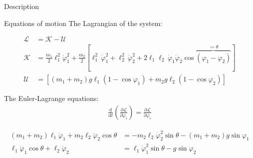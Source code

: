 \documentclass{beamer}
\begin{document}
\begin{frame}{Description}

\begin{figure}
    \centering
    
\end{figure}
\end{frame}

\begin{frame}{Equations of motion}
The Lagrangian of the system:
\begin{small}
\begin{align*}
    \mathcal{L}&=\mathcal{K}-\mathcal{U}\\
    \mathcal{K} &= \frac{m_1}{2} \ell_1^2 \dot \varphi_1^2 + \frac{m_2}{2} \left[ \ell_1^2\, \dot \varphi_1^2 + \ell_2^2\, \dot \varphi_2^2  + 2 \ell_1 \ell_2 \, \dot \varphi_1 \dot \varphi_2 \cos{\overbrace{\left(\varphi_1 - \varphi_2\right)}^{\coloneqq \theta}}\right] \\
    \mathcal{U} &= \left[\left(m_1+m_2\right)g \ell_1 \left(1 - \cos{\varphi_1}\right) + m_2 g \ell_2 \left(1 - \cos \varphi_2\right)\right]
\end{align*}
\end{small}
\pause

The Euler-Lagrange equations:
\begin{align*}
    \frac{\mathrm{d}}{\mathrm{d}t} \left(\frac{\partial \mathcal{L}}{\partial \dot \varphi_i}\right) = \frac{\partial \mathcal{L}}{\partial \varphi_i}
\end{align*}
\pause

\begin{small}
\begin{align*}
    (m_1+m_2) \ell_1 \ddot \varphi_1 + m_2 \ell_2 \ddot \varphi_2 \cos \theta &= -m_2 \ell_2 \dot \varphi_2^2 \sin \theta - (m_1+m_2) g \sin \varphi_1\\
    \ell_1 \ddot \varphi_1 \cos \theta + \ell_2 \ddot \varphi_2 &= \ell_1 \dot \varphi_1^2\sin{\theta} - g \sin \varphi_2
\end{align*}
\end{small}


\end{frame}
\end{document}
